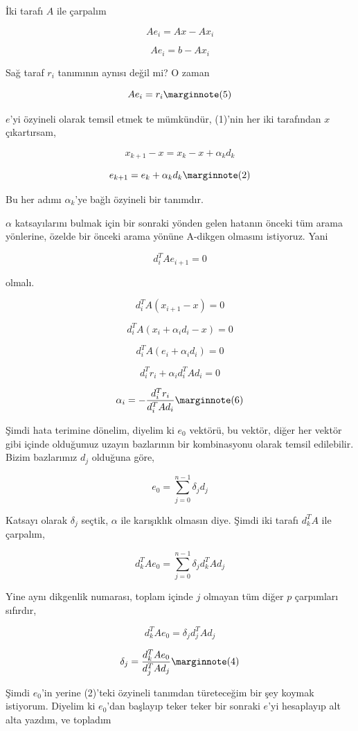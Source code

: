 \documentclass[12pt,fleqn]{article}\usepackage{../../common}
\begin{document}
İki tarafı $A$ ile çarpalım

$$ Ae_i = Ax - Ax_i  $$

$$ Ae_i = b - Ax_i  $$

Sağ taraf $r_i$ tanımının aynısı değil mi? O zaman 

$$
Ae_i = r_i 
\mlabel{5}
$$

$e$'yi özyineli olarak temsil etmek te mümkündür, (1)'nin her iki
tarafından $x$ çıkartırsam, 

$$ x_{k+1} - x = x_k - x + \alpha_k d_{k} $$

$$ e_{k+1} = e_k + \alpha_k d_k 
\mlabel{2}
$$

Bu her adımı $\alpha_k$'ye bağlı özyineli bir tanımdır. 

$\alpha$ katsayılarını bulmak için bir sonraki yönden gelen hatanın önceki
tüm arama yönlerine, özelde bir önceki arama yönüne A-dikgen
olmasını istiyoruz. Yani

$$ d_i^TA e_{i+1}  = 0$$

olmalı. 

$$ d_i^TA (x_{i+1}-x)  = 0$$

$$ d_i^TA (x_{i} + \alpha_i d_i -x)  = 0$$

$$ d_i^TA (e_i + \alpha_i d_i )  = 0$$

$$ d_i^Tr_i + \alpha_i d_i^TA d_i   = 0$$

$$ 
\alpha_i = -\frac{ d_i^Tr_i}{d_i^T A d_i} 
\mlabel{6}
$$

Şimdi hata terimine dönelim, diyelim ki $e_0$ vektörü, bu vektör, diğer
her vektör gibi içinde olduğumuz uzayın bazlarının bir kombinasyonu olarak
temsil edilebilir. Bizim bazlarımız $d_j$ olduğuna göre, 

$$ e_0 = \sum _{ j=0}^{n-1} \delta_j d_j $$

Katsayı olarak $\delta_j$ seçtik, $\alpha$ ile karışıklık olmasın
diye. Şimdi iki tarafı $d_k^T A$ ile çarpalım, 

$$ d_k^T A e_0 = \sum _{ j=0}^{n-1} \delta_j d_k^T A d_j $$

Yine aynı dikgenlik numarası, toplam içinde $j$ olmayan tüm diğer $p$
çarpımları sıfırdır, 

$$ d_k^T A e_0 =  \delta_j d_j^T A d_j $$

$$ \delta_j = \frac{ d_k^T A e_0}{ d_j^T A d_j } 
\mlabel{4}
$$

Şimdi $e_0$'in yerine (2)'teki özyineli tanımdan türeteceğim bir şey koymak
istiyorum. Diyelim ki $e_0$'dan başlayıp teker teker bir sonraki $e$'yi
hesaplayıp alt alta yazdım, ve topladım
\end{document}
